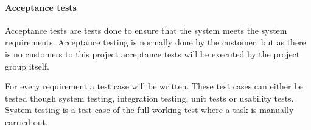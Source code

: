 \documentclass[../report.tex]{subfiles}
\begin{document}
\paragraph{Acceptance tests}

Acceptance tests are tests done to ensure that the system meets the system requirements. Acceptance testing is normally done by the customer, but as there is no customers to this project acceptance tests will be executed by the project group itself.

For every requirement a test case will be written. These test cases can either be tested though system testing, integration testing, unit tests or usability tests. System testing is a test case of the full working test where a task is manually carried out. 
\end{document}
